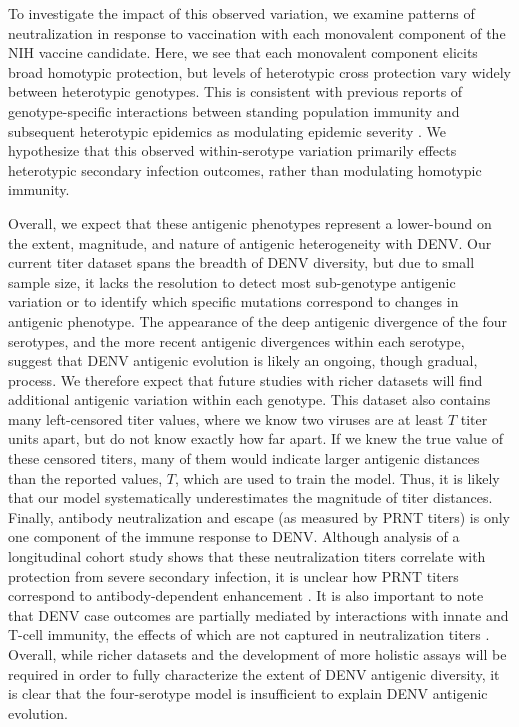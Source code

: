 \documentclass[11pt,oneside,letterpaper]{article}
\begin{document}
To investigate the impact of this observed variation, we examine patterns of neutralization in response to vaccination with each monovalent component of the NIH vaccine candidate.
Here, we see that each monovalent component elicits broad homotypic protection, but levels of heterotypic cross protection vary widely between heterotypic genotypes.
This is consistent with previous reports of genotype-specific interactions between standing population immunity and subsequent heterotypic epidemics as modulating epidemic severity \citep{ohainle2011dynamics, kochel2002effect}.
We hypothesize that this observed within-serotype variation primarily effects heterotypic secondary infection outcomes, rather than modulating homotypic immunity.

Overall, we expect that these antigenic phenotypes represent a lower-bound on the extent, magnitude, and nature of antigenic heterogeneity with DENV.
Our current titer dataset spans the breadth of DENV diversity, but due to small sample size, it lacks the resolution to detect most sub-genotype antigenic variation or to identify which specific mutations correspond to changes in antigenic phenotype.
The appearance of the deep antigenic divergence of the four serotypes, and the more recent antigenic divergences within each serotype, suggest that DENV antigenic evolution is likely an ongoing, though gradual, process.
We therefore expect that future studies with richer datasets will find additional antigenic variation within each genotype.
This dataset also contains many left-censored titer values, where we know two viruses are at least $T$ titer units apart, but do not know exactly how far apart.
If we knew the true value of these censored titers, many of them would indicate larger antigenic distances than the reported values, $T$, which are used to train the model.
Thus, it is likely that our model systematically underestimates the magnitude of titer distances.
Finally, antibody neutralization and escape (as measured by PRNT titers) is only one component of the immune response to DENV.
Although analysis of a longitudinal cohort study shows that these neutralization titers correlate with protection from severe secondary infection, it is unclear how PRNT titers correspond to antibody-dependent enhancement \citep{katzelnick2016neutralizing}.
It is also important to note that DENV case outcomes are partially mediated by interactions with innate and T-cell immunity, the effects of which are not captured in neutralization titers \citep{green2014innate}.
Overall, while richer datasets and the development of more holistic assays will be required in order to fully characterize the extent of DENV antigenic diversity, it is clear that the four-serotype model is insufficient to explain DENV antigenic evolution.
\end{document}

